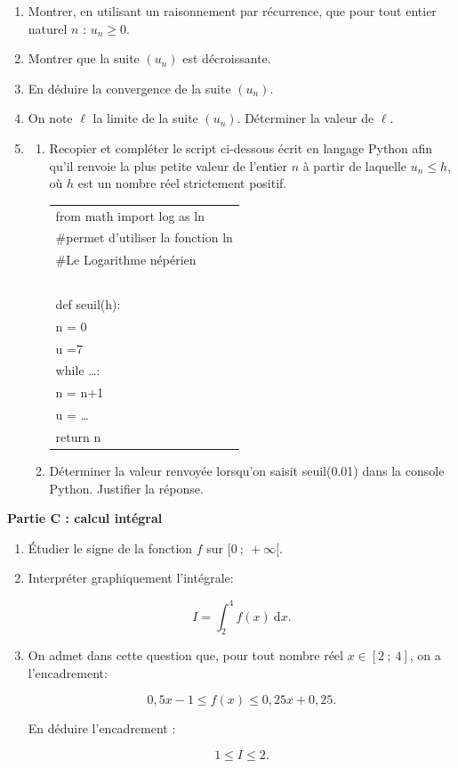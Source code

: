 \documentclass[10pt]{article}
\begin{document}
\begin{enumerate}
\item Montrer, en utilisant un raisonnement par récurrence, que pour tout entier naturel $n$ :
$u_n \geqslant 0$.
\item Montrer que la suite $\left(u_n\right)$ est décroissante.
\item En déduire la convergence de la suite $\left(u_n\right)$.
\item On note $\ell$ la limite de la suite $\left(u_n\right)$. Déterminer la valeur de $\ell$. \item
	\begin{enumerate}
		\item Recopier et compléter le script ci-dessous écrit en langage Python afin qu'il
renvoie la plus petite valeur de l'entier $n$ à partir de laquelle $u_n \leqslant h$, où $h$ est un nombre réel strictement positif.

\begin{center}
\begin{tabular}{|l|}\hline
from math import log as ln\\
\#permet d'utiliser la fonction ln \\
\#Le Logarithme népérien\\
~\\
def seuil(h):\\
\quad n = 0\\
\quad u =7\\
\quad while \ldots :\\
\qquad n = n+1\\
\qquad u = \ldots\\
\quad return n\\ \hline
\end{tabular}
\end{center}

		\item Déterminer la valeur renvoyée lorsqu'on saisit seuil(0.01) dans la console Python. Justifier la réponse.
		\end{enumerate}
\end{enumerate}

\begin{center}\textbf{Partie C : calcul intégral}\end{center}

\begin{enumerate}
\item Étudier le signe de la fonction $f$ sur $[0~;~+\infty[$.
\item Interpréter graphiquement l'intégrale:

\[I = \displaystyle\int_2^4 f(x)\:\text{d}x.\]

\item On admet dans cette question que, pour tout nombre réel $x \in [2~;~4]$, on a
l'encadrement:

\[0,5x -1 \leqslant f(x) \leqslant 0,25x + 0,25.\]

En déduire l'encadrement :

\[ 1 \leqslant I \leqslant 2.\]
\end{enumerate}

\bigskip
\end{document}

